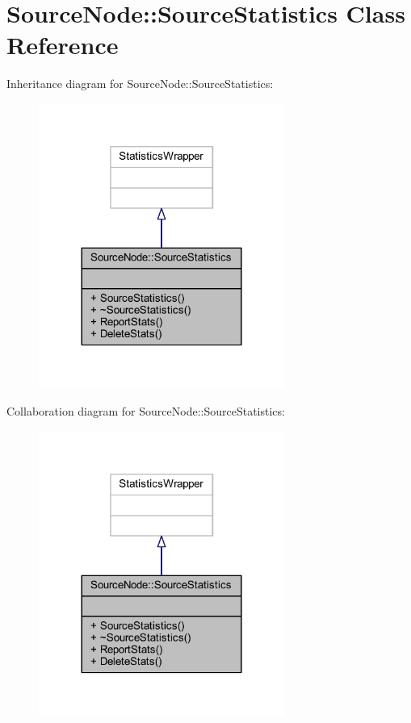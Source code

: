 \hypertarget{class_source_node_1_1_source_statistics}{}\section{Source\+Node\+:\+:Source\+Statistics Class Reference}
\label{class_source_node_1_1_source_statistics}


Inheritance diagram for Source\+Node\+:\+:Source\+Statistics\+:\nopagebreak
\begin{figure}[H]
\begin{center}
\leavevmode
\includegraphics[width=228pt]{class_source_node_1_1_source_statistics__inherit__graph}
\end{center}
\end{figure}


Collaboration diagram for Source\+Node\+:\+:Source\+Statistics\+:\nopagebreak
\begin{figure}[H]
\begin{center}
\leavevmode
\includegraphics[width=228pt]{class_source_node_1_1_source_statistics__coll__graph}
\end{center}
\end{figure}
